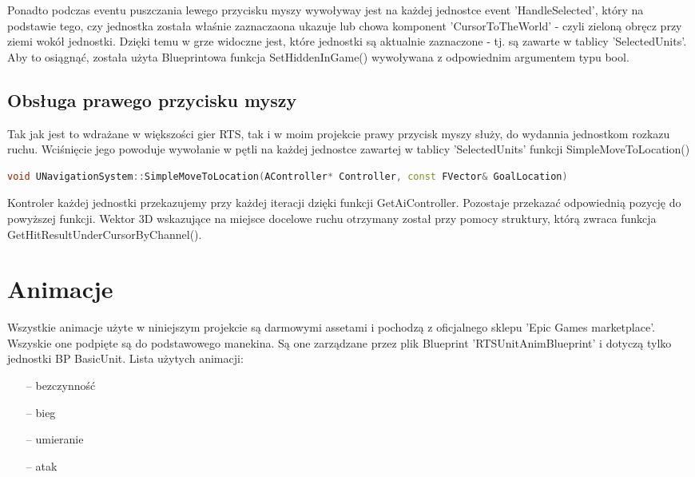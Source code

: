 \documentclass[12pt]{report}
\begin{document}
Ponadto podczas eventu puszczania lewego przycisku myszy wywoływay jest na każdej jednostce event 'HandleSelected', który na podstawie tego, czy jednostka została właśnie zaznaczaona ukazuje lub chowa komponent 'CursorToTheWorld' - czyli zieloną obręcz przy ziemi wokół jednostki. Dzięki temu w grze widoczne jest, które jednostki są aktualnie zaznaczone - tj. są zawarte w tablicy 'SelectedUnits'. Aby to osiągnąć, została użyta Blueprintowa funkcja SetHiddenInGame() wywoływana z odpowiednim argumentem typu bool.

\subsection{Obsługa prawego przycisku myszy}
Tak jak jest to wdrażane w większości gier RTS, tak i w moim projekcie prawy przycisk myszy służy, do wydannia jednostkom rozkazu ruchu. Wciśnięcie jego powoduje wywołanie w pętli na każdej jednostce zawartej w tablicy 'SelectedUnits' funkcji SimpleMoveToLocation()

\begin{lstlisting}[language=C++, backgroundcolor=\color{black!5}, basicstyle=\footnotesize, caption=Funkcja SimpleMoveToLocation() w klasie UNavigationSystem.]
void UNavigationSystem::SimpleMoveToLocation(AController* Controller, const FVector& GoalLocation)
\end{lstlisting}
Kontroler każdej jednostki przekazujemy przy każdej iteracji dzięki funkcji GetAiController. Pozostaje przekazać odpowiednią pozycję do powyższej funkcji. Wektor 3D wskazujące na miejsce docelowe ruchu otrzymany został przy pomocy struktury, którą zwraca funkcja GetHitResultUnderCursorByChannel(). 

\section{Animacje}
Wszystkie animacje użyte w niniejszym projekcie są darmowymi assetami i pochodzą z oficjalnego sklepu 'Epic Games marketplace'. Wszyskie one podpięte są do podstawowego manekina. Są one zarządzane przez plik Blueprint 'RTSUnitAnimBlueprint' i dotyczą tylko jednostki BP BasicUnit. Lista użytych animacji:
\begin{itemize}
\item[--] bezczynność 
\item[--] bieg
\item[--] umieranie 
\item[--] atak 
\end{itemize}
\end{document}

